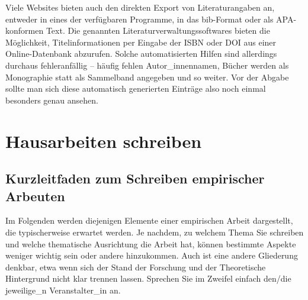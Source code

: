 \documentclass[
  bibliography=totoc,
  oneside,
  12pt,
  a4paper]{scrbook}
\begin{document}
Viele Websites bieten auch den direkten Export von Literaturangaben an, entweder in eines der verfügbaren Programme, in das bib-Format oder als APA-konformen Text. Die genannten Literaturverwaltungssoftwares bieten die Möglichkeit, Titelinformationen per Eingabe der ISBN oder DOI aus einer Online-Datenbank abzurufen. Solche automatisierten Hilfen sind allerdings durchaus fehleranfällig -- häufig fehlen Autor\_innennamen, Bücher werden als Monographie statt als Sammelband angegeben und so weiter. Vor der Abgabe sollte man sich diese automatisch generierten Einträge also noch einmal besonders genau ansehen.

\hypertarget{hausarbeiten-schreiben}{%
\chapter{Hausarbeiten schreiben}\label{hausarbeiten-schreiben}}

\hypertarget{kurzleitfaden-zum-schreiben-empirischer-arbeuten}{%
\section{Kurzleitfaden zum Schreiben empirischer Arbeuten}\label{kurzleitfaden-zum-schreiben-empirischer-arbeuten}}

Im Folgenden werden diejenigen Elemente einer empirischen Arbeit dargestellt,
die typischerweise erwartet werden. Je nachdem, zu welchem Thema Sie
schreiben und welche thematische Ausrichtung die Arbeit hat, können
bestimmte Aspekte weniger wichtig sein oder andere hinzukommen. Auch ist
eine andere Gliederung denkbar, etwa wenn sich der Stand der Forschung
und der Theoretische Hintergrund nicht klar trennen lassen. Sprechen Sie
im Zweifel einfach den/die jeweilige\_n Veranstalter\_in an.
\end{document}
